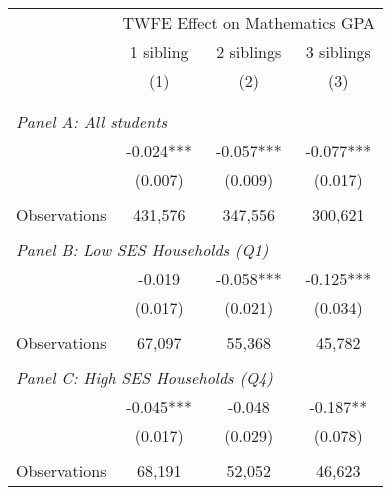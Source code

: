\makeatletter
{}
{
\makeatother
\begin{tabular}{lccc}
\toprule
\cmidrule(lr){2-4}
& \multicolumn{3}{c}{TWFE Effect on Mathematics GPA} \\
\cmidrule(lr){2-4}
& 1 sibling & 2 siblings & 3 siblings  \\
\cmidrule(lr){2-2} \cmidrule(lr){3-3} \cmidrule(lr){4-4}
& (1) & (2) & (3)\\
\bottomrule
&  &  &  \\
&  &  &   \\
\multicolumn{4}{l}{\textit{Panel A: All students}} \\
\hspace{3mm}        &      -0.024***&      -0.057***&      -0.077***\\
                    &     (0.007)   &     (0.009)   &     (0.017)   \\
                    &               &               &               \\
\hspace{3mm}Observations&     431,576   &     347,556   &     300,621   \\
 
&  &  &   \\
\multicolumn{4}{l}{\textit{Panel B: Low SES Households (Q1)}} \\
\hspace{3mm}        &      -0.019   &      -0.058***&      -0.125***\\
                    &     (0.017)   &     (0.021)   &     (0.034)   \\
                    &               &               &               \\
\hspace{3mm}Observations&      67,097   &      55,368   &      45,782   \\
 
&  &  &   \\
\multicolumn{4}{l}{\textit{Panel C: High SES Households (Q4)}} \\
\hspace{3mm}        &      -0.045***&      -0.048   &      -0.187** \\
                    &     (0.017)   &     (0.029)   &     (0.078)   \\
                    &               &               &               \\
\hspace{3mm}Observations&      68,191   &      52,052   &      46,623   \\
 

\end{tabular}}
